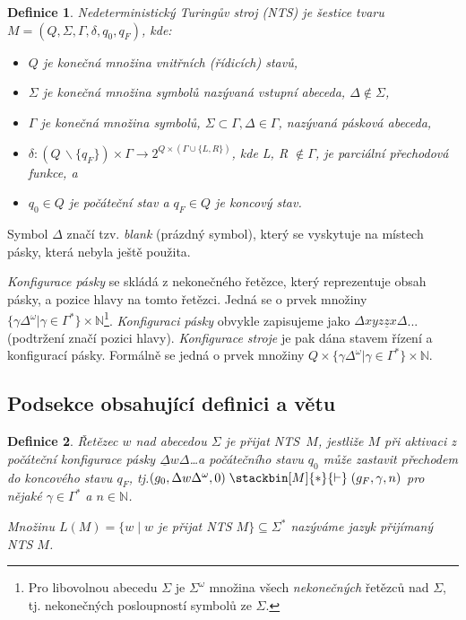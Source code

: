 \documentclass[a4paper, 11pt, twocolumn]{article}
\theoremstyle{definition}
\theoremstyle{plain}
\newtheorem{definicia}{Definice}
\begin{document}
        \begin{definicia} \label{definicia1}
            \emph{Nedeterministický Turingův stroj} (NTS) je šes\-tice tvaru $M  = (Q, \Sigma, \Gamma, \delta, q_0, q_F)$, kde:
            \begin{itemize}
                \item $Q$ je konečná množina \emph{vnitřních (řídicích) stavů,}
                \item $\Sigma$ je konečná množina symbolů nazývaná \emph{vstupní abeceda,} $\Delta \notin \Sigma$,
                \item $\Gamma$ je konečná množina symbolů, $\Sigma \subset \Gamma, \Delta \in \Gamma$, nazývaná \emph{pásková abeceda,}
                \item $\delta: (Q\,\backslash\{q_F\} )\times \Gamma \rightarrow 2^{Q \times (\Gamma \cup\{L,R\})}$, kde L, R $\notin \Gamma$, je parciální \emph{přechodová funkce,} a
                \item $q_0 \in Q$ je \emph{počáteční stav} a $q_F \in Q$ je \emph{koncový stav.}
            \end{itemize}
        \end{definicia}
        Symbol $\Delta$ značí tzv. \emph{blank} (prázdný symbol), který se vyskytuje na místech pásky, která nebyla ještě použita.

        \emph{Konfigurace pásky} se skládá z nekonečného řetězce, který reprezentuje obsah pásky, a pozice hlavy na tomto řetězci. Jedná se o prvek množiny $\{\gamma \Delta^{\omega} | \gamma \in  \Gamma^*\}\times \mathbb{N}$\footnote{Pro libovolnou abecedu $\Sigma$ je $\Sigma^{\omega}$ množina všech \emph{nekonečných} řetězců nad $\Sigma$, tj. nekonečných posloupností symbolů ze $\Sigma$.}.
        \emph{Konfiguraci pásky} obvykle zapisujeme jako $\Delta xyz\underline{z}x\Delta$... (podtržení značí pozici hlavy).
        \emph{Konfigurace stroje} je pak dána stavem řízení a konfigurací pásky. Formálně se jedná o prvek množiny $Q \times\{\gamma \Delta^{\omega} | \gamma \in \Gamma^*\}\times \mathbb{N}$.

    \subsection{Podsekce obsahující definici a větu}

        \begin{definicia}   \label{definicia2}
            \emph{Řetězec} $w$ \emph{nad abecedou} $\Sigma$ \emph{je přijat NTS}~$M$, jestliže $M$ při aktivaci z počáteční konfigurace pásky $\underline{\Delta} w \Delta$\dots a počátečního stavu $q_0$ může zastavit přechodem do koncového stavu $q_F$, tj.$(g_0, \Delta w \Delta^{\omega}, 0)\;\stackbin[M]{*}{\vdash}\;(g_F, \gamma, n)$ pro nějaké $\gamma \in \Gamma^{*}$ a $n \in \mathbb{N}$.
            
            Množinu $L(M) = \{w\;|\;w$ je přijat NTS $M\} \subseteq \Sigma^{*}$ nazýváme \emph{jazyk přijímaný NTS} $M$.
        \end{definicia}
        
\end{document}
